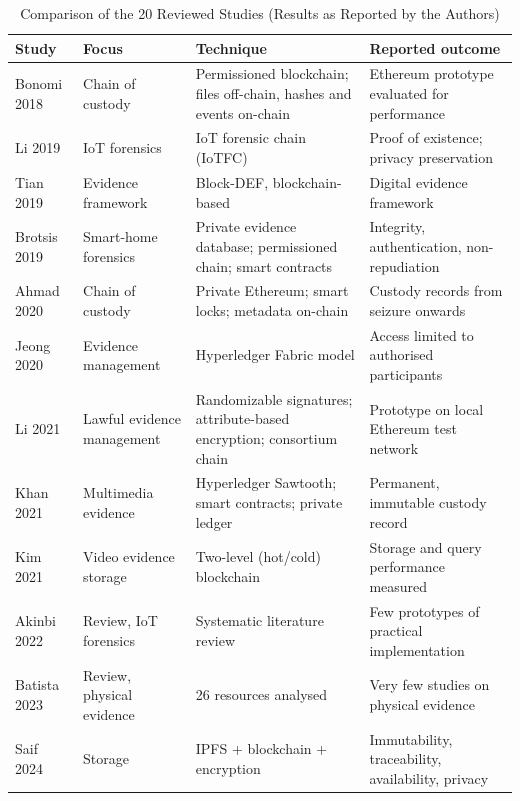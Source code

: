 \documentclass[conference,a4paper,10pt]{IEEEtran}
\begin{document}
\begin{table}[!t]
\caption{Comparison of the 20 Reviewed Studies (Results as Reported by the Authors)}
\label{tab:comparison}
\centering
\footnotesize
\setlength{\tabcolsep}{4pt}
\renewcommand{\arraystretch}{1.1}
\begin{tabular}{L{2.6cm} L{2.9cm} L{6.0cm} L{5.0cm}}
\toprule
\textbf{Study} & \textbf{Focus} & \textbf{Technique} & \textbf{Reported outcome}\\
\midrule
\cite{bonomi} Bonomi 2018 & Chain of custody & Permissioned blockchain; files off-chain, hashes and events on-chain & Ethereum prototype evaluated for performance\\
\cite{sli} Li 2019 & IoT forensics & IoT forensic chain (IoTFC) & Proof of existence; privacy preservation\\
\cite{tian} Tian 2019 & Evidence framework & Block-DEF, blockchain-based & Digital evidence framework\\
\cite{brotsis} Brotsis 2019 & Smart-home forensics & Private evidence database; permissioned chain; smart contracts & Integrity, authentication, non-repudiation\\
\cite{ahmad} Ahmad 2020 & Chain of custody & Private Ethereum; smart locks; metadata on-chain & Custody records from seizure onwards\\
\cite{jeong} Jeong 2020 & Evidence management & Hyperledger Fabric model & Access limited to authorised participants\\
\cite{mli} Li 2021 & Lawful evidence management & Randomizable signatures; attribute-based encryption; consortium chain & Prototype on local Ethereum test network\\
\cite{khan} Khan 2021 & Multimedia evidence & Hyperledger Sawtooth; smart contracts; private ledger & Permanent, immutable custody record\\
\cite{kim} Kim 2021 & Video evidence storage & Two-level (hot/cold) blockchain & Storage and query performance measured\\
\cite{akinbi} Akinbi 2022 & Review, IoT forensics & Systematic literature review & Few prototypes of practical implementation\\
\cite{batista} Batista 2023 & Review, physical evidence & 26 resources analysed & Very few studies on physical evidence\\
\cite{saif} Saif 2024 & Storage & IPFS + blockchain + encryption & Immutability, traceability, availability, privacy\\

\end{tabular}
\end{table}
\end{document}
